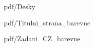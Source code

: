 \documentclass[%
  12pt,       				%
  a4paper,    				%
  oneside,      			%
	unicode,						%
]{report}				    	%
\begin{document}
\pagestyle{empty} %


  {pdf/Desky}

  {pdf/Titulni_strana_barevne}%
   
  {pdf/Zadani_CZ_barevne}%

\makeabstract

%

\makecitation

\makedeclaration

\makeacknowledgement

\tableofcontents

\cleardoublepage\pagestyle{plain}   %



%
\end{document}
